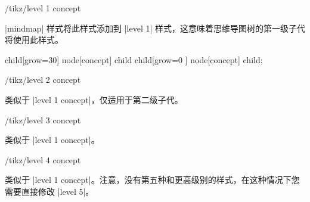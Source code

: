 \begin{stylekey}{/tikz/level 1 concept}

    |mindmap| 样式将此样式添加到 |level 1| 样式，这意味着思维导图树的第一级子代将使用此样式。
\begin{codeexample}[preamble={\usetikzlibrary{mindmap}}]
\tikz
  [root concept/.append style={concept color=blue!80},
   level 1 concept/.append style={concept color=red!50},
   mindmap]
    child[grow=30] {node[concept] {child}}
    child[grow=0 ] {node[concept] {child}};
\end{codeexample}
\end{stylekey}

\begin{stylekey}{/tikz/level 2 concept}

    类似于 |level 1 concept|，仅适用于第二级子代。
\end{stylekey}

\begin{stylekey}{/tikz/level 3 concept}

    类似于 |level 1 concept|。
\end{stylekey}

\begin{stylekey}{/tikz/level 4 concept}

    类似于 |level 1 concept|。注意，没有第五种和更高级别的样式，在这种情况下您需要直接修改 |level 5|。
\end{stylekey}

